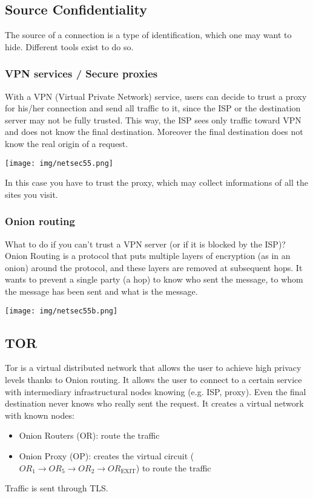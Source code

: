 \documentclass[a4paper, 10pt, titlepage]{article}
\begin{document}
\subsection{Source Confidentiality}
The source of a connection is a type of identification, which one may want to hide. Different tools exist to do so.

\subsubsection*{VPN services / Secure proxies}
With a VPN (Virtual Private Network) service, users can decide to trust a proxy for his/her connection and send all traffic to it, since the ISP or the destination server may not be fully trusted. This way, the ISP sees only traffic toward VPN and does not know the final destination. Moreover the final destination does not know the real origin of a request.
\begin{center}
	\texttt{[image: img/netsec55.png]}
\end{center}
In this case you have to trust the proxy, which may collect informations of all the sites you visit.

\subsubsection*{Onion routing}
What to do if you can’t trust a VPN server (or if it is blocked by the ISP)? Onion Routing is a protocol that puts multiple layers of encryption (as in an onion) around the protocol, and these layers are removed at subsequent hops. It wants to prevent a single party (a hop) to know who sent the message, to whom the message has been sent and what is the message.
\begin{center}
	\texttt{[image: img/netsec55b.png]}
\end{center}

\subsection*{TOR}
Tor is a virtual distributed network that allows the user to achieve high privacy levels thanks to Onion routing. It allows the user to connect to a certain service with intermediary infrastructural nodes knowing (e.g. ISP, proxy). Even the final destination never knows who really sent the request. It creates a virtual network with known nodes:
\begin{itemize}
	\item Onion Routers (OR): route the traffic
	\item Onion Proxy (OP): creates the virtual circuit ($OR_1 \rightarrow OR_5 \rightarrow OR_2 \rightarrow OR_{\text{EXIT}}$) to route the traffic	
\end{itemize}
Traffic is sent through TLS.
\end{document}
